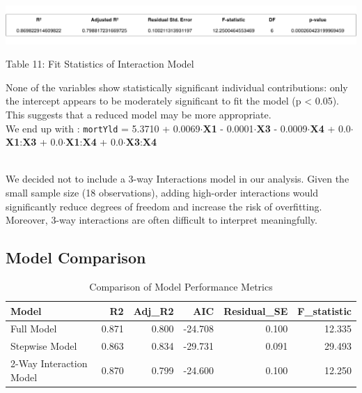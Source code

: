 \documentclass[
  11pt,
]{article}
\begin{document}
\includegraphics[width=1\linewidth]{interaction_model_fitstats.png}

\par
\vspace{-0.3em}

\footnotesize Table 11: Fit Statistics of Interaction Model

\addtocounter{table}{2}

None of the variables show statistically significant individual
contributions: only the intercept appears to be moderately significant
to fit the model (p \textless{} 0.05). This suggests that a reduced
model may be more appropriate.\\
We end up with : \texttt{mortYld} = 5.3710 + 0.0069\(\cdot\)\textbf{X1}
- 0.0001\(\cdot\)\textbf{X3} - 0.0009\(\cdot\)\textbf{X4} +
0.0\(\cdot\)\textbf{X1}:\textbf{X3} +
0.0\(\cdot\)\textbf{X1}:\textbf{X4} +
0.0\(\cdot\)\textbf{X3}:\textbf{X4}\\
\strut \\
We decided not to include a 3-way Interactions model in our analysis.
Given the small sample size (18 observations), adding high-order
interactions would significantly reduce degrees of freedom and increase
the risk of overfitting. Moreover, 3-way interactions are often
difficult to interpret meaningfully.

\subsection{Model Comparison}\label{model-comparison}

\begingroup\fontsize{8}{10}\selectfont

\begin{longtable}[t]{lrrrrr}
\caption{\label{tab:unnamed-chunk-11}Comparison of Model Performance Metrics}\\
\toprule
Model & R2 & Adj\_R2 & AIC & Residual\_SE & F\_statistic\\
\midrule
Full Model & 0.871 & 0.800 & -24.708 & 0.100 & 12.335\\
Stepwise Model & 0.863 & 0.834 & -29.731 & 0.091 & 29.493\\
2-Way Interaction Model & 0.870 & 0.799 & -24.600 & 0.100 & 12.250\\
\bottomrule
\end{longtable}
\endgroup{}
\end{document}

